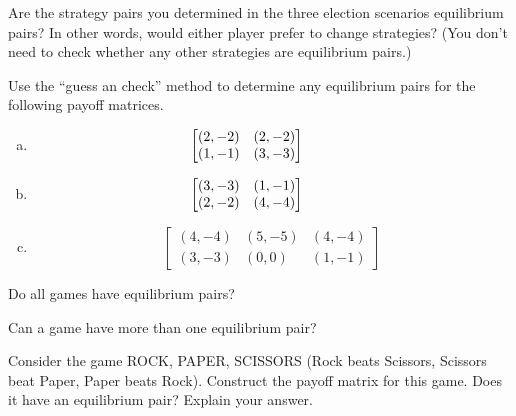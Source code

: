 \begin{xca} Are the strategy pairs you determined in the three election scenarios equilibrium pairs? In other words, would either player prefer to change strategies? (You don't need to check whether any other strategies are equilibrium pairs.)
\end{xca}


\begin{xca} Use the ``guess an check'' method to determine any equilibrium pairs for the following payoff matrices.

\begin{enumerate}[(a)]
\item
\begin{equation*}
 \left[\begin{matrix}
(2,-2)&(2, -2)\\
(1, -1) & (3, -3)
\end{matrix}\right]\hspace{.5in}
\end{equation*}
\item
\begin{equation*}
\left[\begin{matrix}
(3,-3)&(1, -1)\\
(2, -2) & (4, -4)
\end{matrix}\right]\hspace{.5in}
\end{equation*}
\item
\begin{equation*}
\left[\begin{matrix}
(4,-4)&(5, -5)&(4, -4)\\
(3, -3) & (0, 0)&(1, -1)
\end{matrix}\right]
\end{equation*}
\end{enumerate}
\end{xca}

\begin{xca}
Do all games have equilibrium pairs?
\end{xca}

\begin{xca}
Can a game have more than one equilibrium pair?
\end{xca}

\begin{xca}
Consider the game ROCK, PAPER, SCISSORS (Rock beats Scissors, Scissors beat Paper, Paper beats Rock). Construct the payoff matrix for this game. Does it have an equilibrium pair? Explain your answer.
\end{xca}

